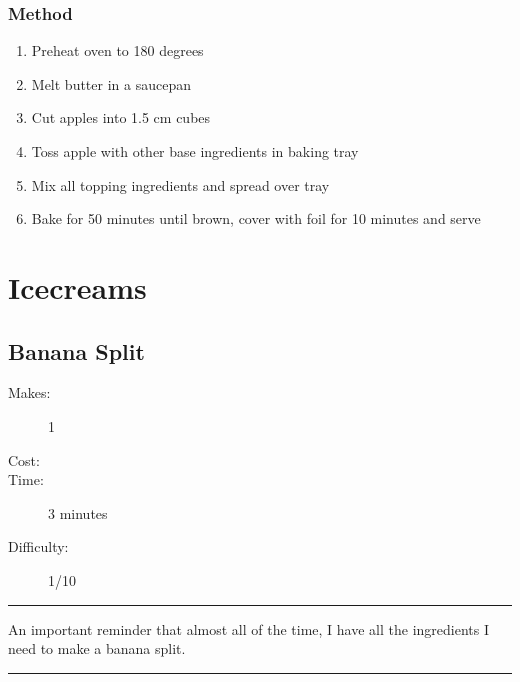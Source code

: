 \documentclass[]{article}
\begin{document}
\subsubsection*{\Large Method}
\begin{enumerate}[font=\huge\color{accent}]
	\item Preheat oven to 180 degrees
	\item Melt butter in a saucepan
	\item Cut apples into 1.5 cm cubes
	\item Toss apple with other base ingredients in baking tray
	\item Mix all topping ingredients and spread over tray
	\item Bake for 50 minutes until brown, cover with foil for 10 minutes and serve
\end{enumerate}
\newpage
{}
\section*{\center\Huge\color{accent}Icecreams}
\label{cat:Icecreams}
\label{rec:Banana Split}
\subsection*{\center\huge Banana Split}
\begin{description}
\item[Makes:] 1 
\item[Cost:] \textdollar
\item[Time:] 3 minutes
\item[Difficulty:] 1/10
\end{description}
\vspace{0.2cm}\hrule\vspace{0.5cm}
\begin{adjustwidth}{0.5 cm}{0.5 cm}

An important reminder that almost all of the time, I have all the ingredients I need to make a banana split. \hfill{}\color{black}

\end{adjustwidth}
\vspace{0.5cm}\hrule
\end{document}
